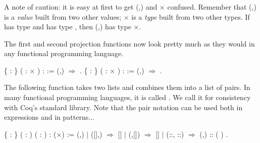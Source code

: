 \documentclass[12pt]{report}
\begin{document}
\subsubsection{ }

 A note of caution: it is easy at first to get (,) and
    \ensuremath{\times} confused.  Remember that (,) is a \textit{value} built from two
    other values; \ensuremath{\times} is a \textit{type} built from two other types.  If
     has type  and  has type , then (,) has type
    \ensuremath{\times}. 

 The first and second projection functions now look pretty
    much as they would in any functional programming language. \begin{coqdoccode}
\coqdocemptyline
\coqdocnoindent
{}  \{  : \} ( :  \ensuremath{\times} ) :  :=\coqdoceol
\coqdocindent{1.00em}
   (,) \ensuremath{\Rightarrow}  .\coqdoceol
\coqdocemptyline
\coqdocnoindent
{}  \{  : \} ( :  \ensuremath{\times} ) :  :=\coqdoceol
\coqdocindent{1.00em}
   (,) \ensuremath{\Rightarrow}  .\coqdoceol
\coqdocemptyline
\end{coqdoccode}
The following function takes two lists and combines them
    into a list of pairs.  In many functional programming languages,
    it is called .  We call it  for consistency with
    Coq's standard library.  Note that the pair notation can be used both in expressions and in
    patterns... \begin{coqdoccode}
\coqdocemptyline
\coqdocnoindent
{}  \{  : \} ( :  ) ( :  )\coqdoceol
\coqdocindent{5.50em}
:  (\ensuremath{\times}) :=\coqdoceol
\coqdocindent{1.00em}
 (,) \coqdoceol
\coqdocindent{1.00em}
\ensuremath{|} ([],\coqdocvar{\_}) \ensuremath{\Rightarrow} []\coqdoceol
\coqdocindent{1.00em}
\ensuremath{|} (\coqdocvar{\_},[]) \ensuremath{\Rightarrow} []\coqdoceol
\coqdocindent{1.00em}
\ensuremath{|} (::, ::) \ensuremath{\Rightarrow} (,) :: (  )\coqdoceol
\coqdocindent{1.00em}
.\coqdoceol
\coqdocemptyline
\end{coqdoccode}
\end{document}
